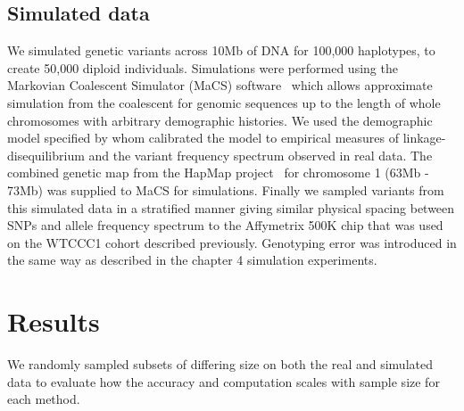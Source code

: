 \subsection{Simulated data}
We simulated genetic variants across 10Mb of DNA for 100,000 haplotypes, to create 50,000 diploid individuals. Simulations were performed using the Markovian Coalescent Simulator (MaCS) software~\citep{chen2009fast} which allows approximate simulation from the coalescent for genomic sequences up to the length of whole chromosomes with arbitrary demographic histories.  We used the demographic model specified by \cite{schaffner2005calibrating} whom calibrated the model to empirical measures of linkage-disequilibrium and the variant frequency spectrum observed in real data.  The combined genetic map from the HapMap project~\citep{hapmap2} for chromosome 1 (63Mb - 73Mb) was supplied to MaCS for simulations.  Finally we sampled variants from this simulated data in a stratified manner giving similar physical spacing between SNPs and  allele frequency spectrum to the Affymetrix 500K chip that was used on the WTCCC1 cohort described previously.  Genotyping error was introduced in the same way as described in the chapter 4 simulation experiments.

\section{Results}
We randomly sampled subsets of differing size on both the real and simulated data to evaluate how the accuracy and computation scales with sample size for each method.

